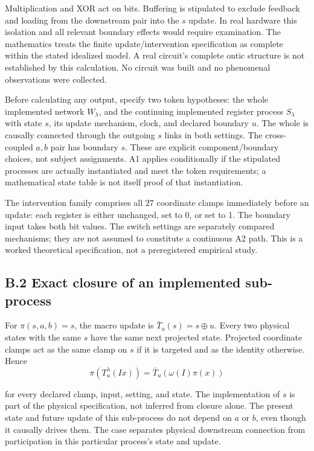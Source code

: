 \documentclass[
  11pt,
  a4paper,
]{article}
\begin{document}
Multiplication and XOR act on bits. Buffering is stipulated to exclude
feedback and loading from the downstream pair into the \(s\) update. In
real hardware this isolation and all relevant boundary effects would
require examination. The mathematics treats the finite
update/intervention specification as complete within the stated
idealized model. A real circuit's complete ontic structure is not
established by this calculation. No circuit was built and no phenomenal
observations were collected.

Before calculating any output, specify two token hypotheses: the whole
implemented network \(W_\lambda\), and the continuing implemented
register process \(S_\lambda\) with state \(s\), its update mechanism,
clock, and declared boundary \(u\). The whole is causally connected
through the outgoing \(s\) links in both settings. The cross-coupled
\(a,b\) pair has boundary \(s\). These are explicit component/boundary
choices, not subject assignments. A1 applies conditionally if the
stipulated processes are actually instantiated and meet the token
requirements; a mathematical state table is not itself proof of that
instantiation.

The intervention family comprises all 27 coordinate clamps immediately
before an update: each register is either unchanged, set to 0, or set to
1. The boundary input takes both bit values. The switch settings are
separately compared mechanisms; they are not assumed to constitute a
continuous A2 path. This is a worked theoretical specification, not a
preregistered empirical study.

\hypertarget{b.2-exact-closure-of-an-implemented-sub-process}{%
\subsection{B.2 Exact closure of an implemented
sub-process}\label{b.2-exact-closure-of-an-implemented-sub-process}}

For \(\pi(s,a,b)=s\), the macro update is \(\bar T_u(s)=s\oplus u\).
Every two physical states with the same \(s\) have the same next
projected state. Projected coordinate clamps act as the same clamp on
\(s\) if it is targeted and as the identity otherwise. Hence
\nopagebreak[4]
\[
\pi(T_u^\lambda(Ix))
=\bar T_u(\omega(I)\pi(x))
\]

for every declared clamp, input, setting, and state. The implementation
of \(s\) is part of the physical specification, not inferred from
closure alone. The present state and future update of this sub-process
do not depend on \(a\) or \(b\), even though it causally drives them.
The case separates physical downstream connection from participation in
this particular process's state and update.
\end{document}
